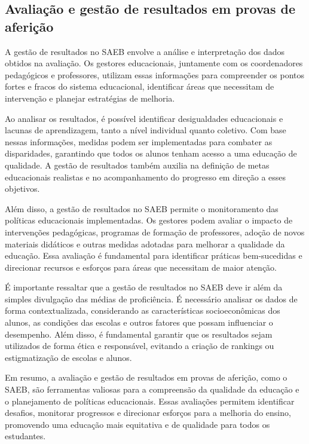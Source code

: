 \subsection{Avaliação e gestão de resultados em provas de
aferição}\label{avaliauxe7uxe3o-e-gestuxe3o-de-resultados-em-provas-de-aferiuxe7uxe3o}

A gestão de resultados no SAEB envolve a análise e interpretação dos
dados obtidos na avaliação. Os gestores educacionais, juntamente com os
coordenadores pedagógicos e professores, utilizam essas informações para
compreender os pontos fortes e fracos do sistema educacional,
identificar áreas que necessitam de intervenção e planejar estratégias
de melhoria.

Ao analisar os resultados, é possível identificar desigualdades
educacionais e lacunas de aprendizagem, tanto a nível individual quanto
coletivo. Com base nessas informações, medidas podem ser implementadas
para combater as disparidades, garantindo que todos os alunos tenham
acesso a uma educação de qualidade. A gestão de resultados também
auxilia na definição de metas educacionais realistas e no acompanhamento
do progresso em direção a esses objetivos.

Além disso, a gestão de resultados no SAEB permite o monitoramento das
políticas educacionais implementadas. Os gestores podem avaliar o
impacto de intervenções pedagógicas, programas de formação de
professores, adoção de novos materiais didáticos e outras medidas
adotadas para melhorar a qualidade da educação. Essa avaliação é
fundamental para identificar práticas bem-sucedidas e direcionar
recursos e esforços para áreas que necessitam de maior atenção.

É importante ressaltar que a gestão de resultados no SAEB deve ir além
da simples divulgação das médias de proficiência. É necessário analisar
os dados de forma contextualizada, considerando as características
socioeconômicas dos alunos, as condições das escolas e outros fatores
que possam influenciar o desempenho. Além disso, é fundamental garantir
que os resultados sejam utilizados de forma ética e responsável,
evitando a criação de rankings ou estigmatização de escolas e alunos.

Em resumo, a avaliação e gestão de resultados em provas de aferição,
como o SAEB, são ferramentas valiosas para a compreensão da qualidade da
educação e o planejamento de políticas educacionais. Essas avaliações
permitem identificar desafios, monitorar progressos e direcionar
esforços para a melhoria do ensino, promovendo uma educação mais
equitativa e de qualidade para todos os estudantes.

